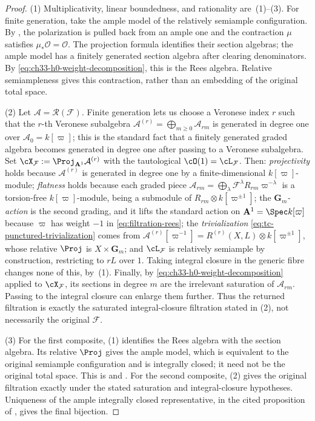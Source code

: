 \begin{proof}
(1) Multiplicativity, linear boundedness, and rationality are \,(1)--(3). For finite generation, take the ample model of the relatively semiample configuration. By \cite[Proposition~2.17]{BHJ17}, the polarization is pulled back from an ample one and the contraction $\mu$ satisfies $\mu_*\mathcal O=\mathcal O$. The projection formula identifies their section algebras; the ample model has a finitely generated section algebra after clearing denominators. By \eqref{eq:ch33-h0-weight-decomposition}, this is the Rees algebra. Relative semiampleness gives this contraction, rather than an embedding of the original total space.

(2)  Let $\mathcal A=\mathcal R(\mathcal F)$.  Finite generation lets us
choose a Veronese index $r$ such that the $r$-th Veronese subalgebra
$\mathcal A^{(r)}=\bigoplus_{m\geq0}\mathcal A_{rm}$ is generated in
degree one over $\mathcal A_0=k[\varpi]$; this is the standard fact that
a finitely generated graded algebra becomes generated in degree one after
passing to a Veronese subalgebra.  Set
$\cX_{\mathcal F}:=\Proj_{\mathbf A^1}\mathcal A^{(r)}$ with the
tautological $\cO(1)=\cL_{\mathcal F}$.  Then:
\emph{projectivity} holds because $\mathcal A^{(r)}$ is generated in
degree one by a finite-dimensional $k[\varpi]$-module;
\emph{flatness} holds because each graded piece
$\mathcal A_{rm}=\bigoplus_\lambda\mathcal F^\lambda R_{rm}
\varpi^{-\lambda}$ is a torsion-free $k[\varpi]$-module, being a
submodule of $R_{rm}\otimes k[\varpi^{\pm1}]$;
the \emph{$\mathbf G_m$-action} is the second grading, and it lifts the
standard action on $\mathbf A^1=\Spec k[\varpi]$ because
$\varpi$ has weight $-1$ in \eqref{eq:filtration-rees};
the \emph{trivialization} \eqref{eq:tc-punctured-trivialization} comes from
$\mathcal A^{(r)}[\varpi^{-1}]=R^{(r)}(X,L)\otimes k[\varpi^{\pm1}]$,
whose relative $\Proj$ is $X\times\mathbf G_m$;
and $\cL_{\mathcal F}$ is relatively semiample by construction, restricting
to $rL$ over $1$.  Taking integral closure in the generic fibre changes
none of this, by
\,(1).  Finally, by
\eqref{eq:ch33-h0-weight-decomposition} applied to
$\cX_{\mathcal F}$, its sections in degree $m$ are the irrelevant
saturation of $\mathcal A_{rm}$.  Passing to the integral closure can
enlarge them further.  Thus the returned filtration is exactly the
saturated integral-closure filtration stated in (2), not necessarily the
original $\mathcal F$.

(3) For the first composite, (1) identifies the Rees algebra with the section algebra. Its relative $\Proj$ gives the ample model, which is equivalent to the original semiample configuration and is integrally closed; it need not be the original total space. This is \cite[Proposition~2.17]{BHJ17} and \cite[Proposition~2.30]{BJ22}. For the second composite, (2) gives the original filtration exactly under the stated saturation and integral-closure hypotheses. Uniqueness of the ample integrally closed representative, in the cited proposition of \cite{BJ22}, gives the final bijection.
\end{proof}

